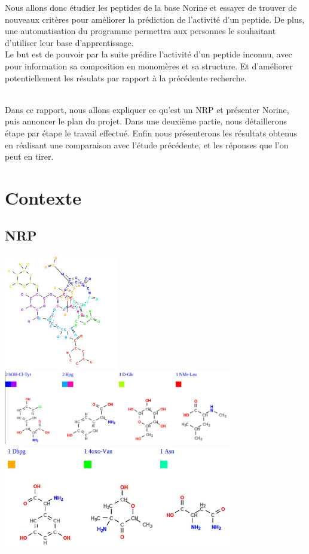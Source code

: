 \documentclass[a4paper,10pt]{report}
\begin{document}
      Nous allons donc étudier les peptides de la base Norine et essayer de trouver de nouveaux critères pour améliorer la prédiction de l'activité d'un peptide. De plus, une automatisation du programme permettra aux personnes le souhaitant d'utiliser leur base d'apprentissage.
      ~~\\Le but est de pouvoir par la suite prédire l'activité d'un peptide inconnu, avec pour information sa composition en monomères et sa structure. Et d'améliorer potentiellement les résulats par rapport à la précédente recherche.
     
     
      ~~\\Dans ce rapport, nous allons expliquer ce qu'est un NRP et présenter Norine, puis annoncer le plan du projet. Dans une deuxième partie, nous détaillerons étape par étape le travail effectué. Enfin nous présenterons les résultats obtenus en réalisant une comparaison avec l'étude précédente, et les réponses que l'on peut en tirer.
     
      \newpage


  \chapter{Contexte}

    
    \section{NRP}
    

     
      \begin{minipage}[c]{\textwidth}
	\centering
	  \includegraphics[width=5cm]{image/v.jpeg}
	  \includegraphics[width=10cm]{image/mono1.jpeg}
	  \includegraphics[width=10cm]{image/mono2.jpeg}
	  \label{image1}
	\end{minipage}
	
\end{document}
